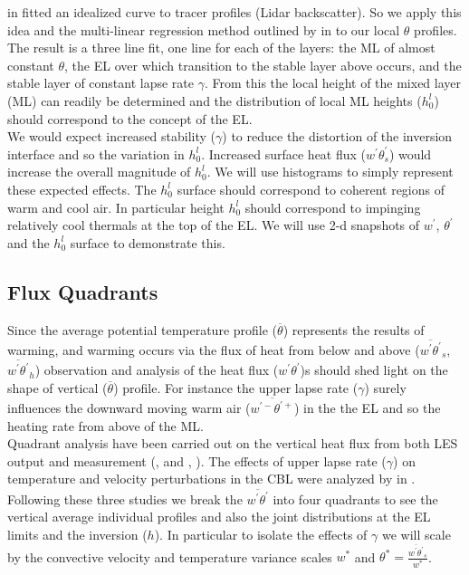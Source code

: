 \citeauthor{SteynBaldHoff} in \cite{SteynBaldHoff} fitted an idealized curve to tracer profiles (Lidar backscatter).  So we apply this idea and the multi-linear regression method outlined by \citeauthor{Vieth} in \cite{Vieth} to our local $\theta$ profiles.  The result is a three line fit, one line for each of the layers: the \acs{ML} of almost constant $\theta$, the \acs{EL} over which transition to the stable layer above occurs, and the stable layer of constant lapse rate $\gamma$.  From this the local height of the mixed layer (\acs{ML}) can readily be determined and the distribution of local \acs{ML} heights ($h^{l}_{0}$) should correspond to the concept of the \acs{EL}.\\

We would expect increased stability ($\gamma$) to reduce the distortion of the inversion interface and so the variation in $h^{l}_{0}$. Increased surface heat flux ($w^{'}\theta^{'}_{s}$) would increase the overall magnitude of $h^{l}_{0}$.  We will use histograms to simply represent these expected effects.  The $h^{l}_{0}$ surface should correspond to coherent regions of warm and cool air.  In particular height $h^{l}_{0}$ should correspond to impinging relatively cool thermals at the top of the \acs{EL}. We will use 2-d snapshots of $w^{'}$, $\theta^{'}$ and the $h^{l}_{0}$ surface to demonstrate this.

\subsection{Flux Quadrants}

Since the average potential temperature profile ($\overline{\theta}$) represents the results of warming, and warming occurs via the flux of heat from below and above ($\overline{w^{'}\theta^{'}}_{s}$, $\overline{w^{'}\theta^{'}}_{h}$) observation and analysis of the heat flux ($w^{'}\theta^{'}$)s should shed light on the shape of vertical ($\overline{\theta}$) profile.  For instance the upper lapse rate ($\gamma$) surely influences the downward moving warm air ($\overline{w^{'-}\theta^{'+}}$) in the the \acs{EL} and so the heating rate from above of the \acs{ML}.\\

Quadrant analysis have been carried out on the vertical heat flux from both LES output and measurement (\citeauthor{SullMoengStev}, \cite{SullMoengStev} and \citeauthor{MahrtPaum}, \cite{MahrtPaum}).  The effects of upper lapse rate ($\gamma$) on temperature and velocity perturbations in the \acs{CBL} were analyzed by \citeauthor{Sorbjan} in \cite{Sorbjan}.  Following these three studies we break the $\overline{w^{'}\theta^{'}}$ into four quadrants to see the vertical average individual profiles and also the joint distributions at the \acs{EL} limits and the inversion ($h$).  In particular to isolate the effects of $\gamma$ we will scale by the convective velocity and temperature variance scales $w^{*}$ and $\theta^{*}=\frac{\overline{w^{'}\theta^{'}}_{s}}{w^{*}}$.

